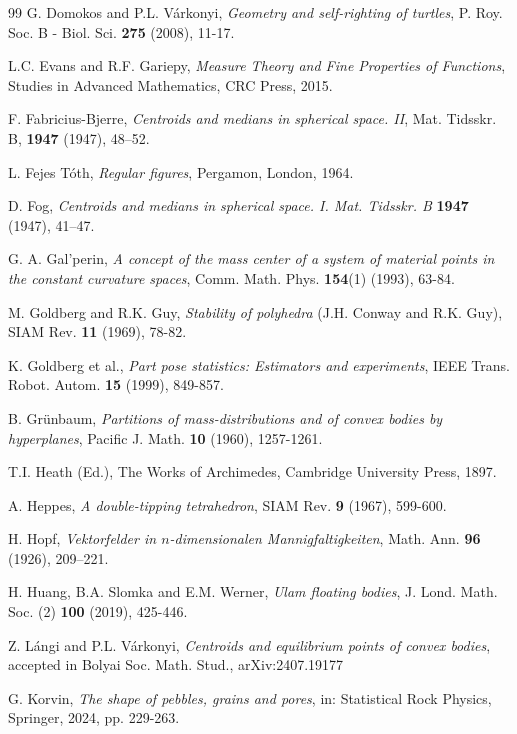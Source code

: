 \documentclass[twoside]{amsart}
\theoremstyle{plain}
\theoremstyle{definition}
\numberwithin{equation}{section}
\begin{document}
\begin{thebibliography}{99}
 G. Domokos and P.L. V\'arkonyi, \emph{Geometry and self-righting of turtles}, P. Roy. Soc. B - Biol. Sci. \textbf{275} (2008), 11-17.

 L.C. Evans and R.F. Gariepy, \emph{Measure Theory and Fine Properties of Functions}, Studies in Advanced Mathematics, CRC Press, 2015.

 F. Fabricius-Bjerre, \emph{Centroids and medians in spherical space. II}, Mat. Tidsskr. B, \textbf{1947} (1947), 48–52.

 L. Fejes T\'oth, \emph{Regular figures}, Pergamon, London, 1964.

 D. Fog, \emph{Centroids and medians in spherical space. I. Mat. Tidsskr. B} \textbf{1947} (1947), 41–47.

 G. A. Gal'perin, \emph{A concept of the mass center of a system of material points in the constant curvature
spaces}, Comm. Math. Phys. \textbf{154}(1) (1993), 63-84.

 M. Goldberg and R.K. Guy, \emph{Stability of polyhedra} (J.H. Conway and R.K. Guy), SIAM Rev. \textbf{11} (1969), 78-82.

 K. Goldberg et al., \emph{Part pose statistics: Estimators and experiments}, IEEE Trans. Robot. Autom. \textbf{15} (1999), 849-857.

 B. Gr\"unbaum, \emph{Partitions of mass-distributions and of convex bodies by hyperplanes}, Pacific J. Math. \textbf{10} (1960), 1257-1261.

 T.I. Heath (Ed.), The Works of Archimedes, Cambridge University Press, 1897.

 A. Heppes, \emph{A double-tipping tetrahedron}, SIAM Rev.  \textbf{9} (1967), 599-600.

 H. Hopf, \emph{Vektorfelder in $n$-dimensionalen Mannigfaltigkeiten}, Math. Ann. \textbf{96} (1926), 209–221.

 H. Huang, B.A. Slomka and E.M. Werner, \emph{Ulam floating bodies}, J. Lond. Math. Soc. (2) \textbf{100} (2019), 425-446.

 Z. L\'angi and P.L. V\'arkonyi, \emph{Centroids and equilibrium points of convex bodies}, accepted in Bolyai Soc. Math. Stud., arXiv:2407.19177

 G. Korvin, \emph{The shape of pebbles, grains and pores}, in: Statistical Rock Physics, Springer, 2024, pp. 229-263.


\end{thebibliography}
\end{document}
